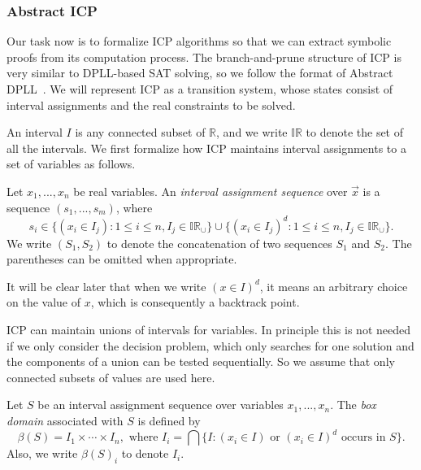 \documentclass[envcountsect]{llncs}
\begin{document}
\subsubsection{Abstract ICP} Our task now is to formalize ICP algorithms
so that we can extract symbolic proofs from its computation process. The
branch-and-prune structure of ICP is very similar to DPLL-based SAT solving, so 
we follow the format of Abstract DPLL~\cite{}. We will represent ICP
as a transition system, whose states consist of interval assignments and the
real constraints to be solved. 

An interval $I$ is any connected subset of
$\mathbb{R}$, and we write $\mathbb{IR}$ to denote the set of all the intervals.
We first formalize how ICP maintains interval assignments to a set of variables
as follows. 
\begin{definition}
Let $x_1,...,x_n$ be real variables. An {\em interval assignment sequence} over
$\vec x$ is a sequence $(s_1,...,s_m)$, where
$$s_i\in \{(x_i\in I_j): 1\leq i\leq n, I_j\in
\mathbb{IR}_{\cup}\}\cup\{(x_i\in I_j)^d: 1\leq i\leq n, I_j\in
\mathbb{IR}_{\cup}\}.
$$
We write $(S_1, S_2)$ to denote the concatenation of two sequences $S_1$ and
$S_2$. The parentheses can be omitted when appropriate. 
\end{definition}
It will be clear later that when we write $(x\in I)^d$, it means an arbitrary
choice on the value of $x$, which is consequently a backtrack point. 
\begin{remark}
ICP can maintain unions of intervals for variables. In principle this is not
needed if we only consider the decision problem, which only searches for
one solution and the components of a union can be tested sequentially. So we
assume that only connected subsets of values are used here. 
\end{remark}

\begin{definition}
Let $S$ be an interval assignment sequence over variables $x_1,...,x_n$. The
{\em box
domain} associated with $S$ is defined by
$$\beta(S) = I_1\times\cdots \times I_n, \mbox{ where }I_i = \bigcap\{ I:
(x_i\in
I)\mbox{ or } (x_i\in I)^d \mbox{ occurs in } S\}.$$
Also, we write $\beta(S)_i$ to denote $I_i$. 
\end{definition}
\end{document}
